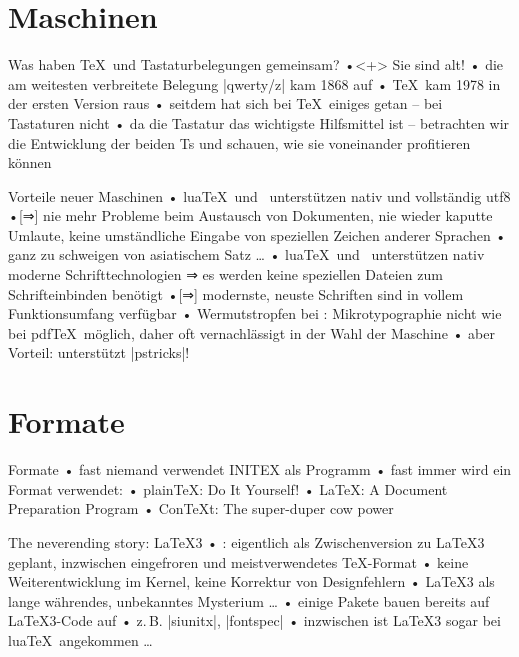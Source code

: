 \documentclass[t]{beamer}
\begin{document}
\section{Maschinen}
\begin{frame}{Was haben \TeX\ und Tastaturbelegungen gemeinsam?}
•<+> Sie sind alt!
• die am weitesten verbreitete Belegung |qwerty/z| kam 1868 auf
• \TeX\ kam 1978 in der ersten Version raus
• seitdem hat sich bei \TeX\ einiges getan – bei Tastaturen nicht
• da die Tastatur das wichtigste Hilfsmittel ist – betrachten wir die Entwicklung der beiden Ts und schauen, wie sie voneinander profitieren können
\•
\end{frame}


\begin{frame}{Vorteile neuer Maschinen}
• lua\TeX\ und \XeTeX\ unterstützen nativ und vollständig utf8
•[⇒] nie mehr Probleme beim Austausch von Dokumenten, nie wieder kaputte Umlaute, keine umständliche Eingabe von speziellen Zeichen anderer Sprachen
• ganz zu schweigen von asiatischem Satz …
• lua\TeX\ und \XeTeX\ unterstützen nativ moderne Schrifttechnologien ⇒ es werden keine speziellen Dateien zum Schrifteinbinden benötigt
•[⇒] modernste, neuste Schriften sind in vollem Funktionsumfang verfügbar
• Wermutstropfen bei \XeTeX: Mikrotypographie nicht wie bei pdf\TeX\ möglich, daher oft vernachlässigt in der Wahl der Maschine
• aber Vorteil: unterstützt |pstricks|!
\•
\end{frame}

\section{Formate}
\begin{frame}{Formate}
• fast niemand verwendet INITEX als Programm
• fast immer wird ein Format verwendet:
• plain\TeX: Do It Yourself!
• \LaTeX: A Document Preparation Program
• Con\TeX t: The super-duper cow power
\•
\end{frame}

\begin{frame}{The neverending story: \LaTeX3}   %
• \LaTeXe: eigentlich als Zwischenversion zu \LaTeX3 geplant, inzwischen eingefroren und meistverwendetes \TeX-Format
• keine Weiterentwicklung im Kernel, keine Korrektur von Designfehlern
• \LaTeX3 als lange währendes, unbekanntes Mysterium …
• einige Pakete bauen bereits auf \LaTeX3-Code auf
• z.\,B. |siunitx|, |fontspec|
• inzwischen ist \LaTeX3 sogar bei lua\TeX\ angekommen …
\•
\end{frame}
\end{document}
